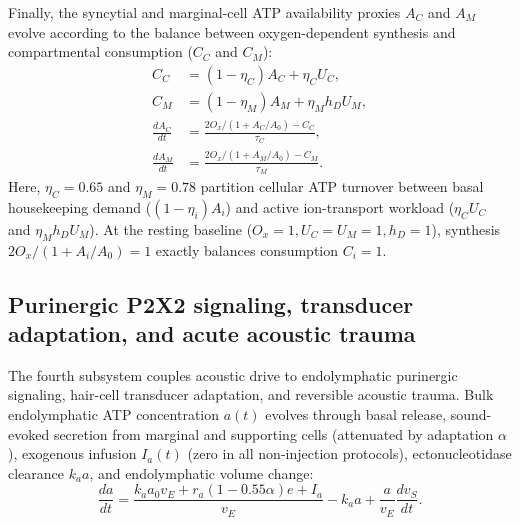 \documentclass[final,5p,times]{elsarticle}
\begin{document}
Finally, the syncytial and marginal-cell ATP availability proxies \(A_C\) and \(A_M\) evolve according to the balance between oxygen-dependent synthesis and compartmental consumption (\(C_C\) and \(C_M\)):
\begin{align}
  C_C &= (1 - \eta_C)A_C + \eta_C U_C, \label{eq:cc}\\
  C_M &= (1 - \eta_M)A_M + \eta_M h_D U_M, \label{eq:cm}\\
  \frac{dA_C}{dt} &= \frac{2O_x / (1 + A_C / A_0) - C_C}{\tau_C}, \label{eq:dac}\\
  \frac{dA_M}{dt} &= \frac{2O_x / (1 + A_M / A_0) - C_M}{\tau_M}. \label{eq:dam}
\end{align}
Here, \(\eta_C = 0.65\) and \(\eta_M = 0.78\) partition cellular ATP turnover between basal housekeeping demand (\((1 - \eta_i)A_i\)) and active ion-transport workload (\(\eta_C U_C\) and \(\eta_M h_D U_M\)). At the resting baseline (\(O_x = 1, U_C = U_M = 1, h_D = 1\)), synthesis \(2O_x/(1 + A_i/A_0) = 1\) exactly balances consumption \(C_i = 1\).

\subsection{Purinergic P2X2 signaling, transducer adaptation, and acute acoustic trauma}\label{sec:formulation-purinergic}

The fourth subsystem couples acoustic drive to endolymphatic purinergic signaling, hair-cell transducer adaptation, and reversible acoustic trauma. Bulk endolymphatic ATP concentration \(a(t)\) evolves through basal release, sound-evoked secretion from marginal and supporting cells (attenuated by adaptation \(\alpha\)), exogenous infusion \(I_a(t)\) (zero in all non-injection protocols), ectonucleotidase clearance \(k_a a\), and endolymphatic volume change:
\begin{equation}
  \frac{da}{dt} = \frac{k_a a_0 v_E + r_a(1 - 0.55\alpha)e + I_a}{v_E} - k_a a + \frac{a}{v_E}\frac{dv_S}{dt}.
  \label{eq:atp-endo}
\end{equation}
\end{document}
